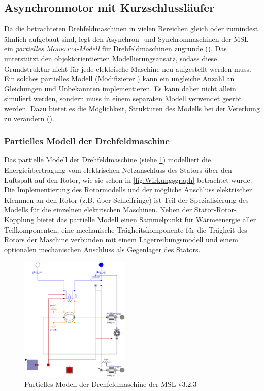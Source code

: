 \subsection{Asynchronmotor mit Kurzschlussläufer}\label{sec:asynchronmotor-mit-kurzschlussluxe4ufer}
Da die betrachteten Drehfeldmaschinen in vielen Bereichen gleich oder zumindest ähnlich aufgebaut sind, legt \cite{kralModelicaObjektorientierteModellbildung2019} den Asynchron- und Synchronmaschinen der MSL ein \emph{partielles \textsc{Modelica}-Modell} für Drehfeldmaschinen zugrunde (). Das unterstützt den objektorientierten Modellierungsansatz, sodass diese Grundstruktur nicht für jede elektrische Maschine neu aufgestellt werden muss. Ein solches partielles Modell (Modifizierer ) kann ein ungleiche Anzahl an Gleichungen und Unbekannten implementieren. Es kann daher nicht allein simuliert werden, sondern muss in einem separaten Modell verwendet geerbt werden. Dazu bietet es die Möglichkeit, Strukturen des Modells bei der Vererbung zu verändern ().

\subsubsection{Partielles Modell der Drehfeldmaschine}\label{sec:partielles-modell-der-drehfeldmaschine}
Das partielle Modell der Drehfeldmaschine (siehe \cref{fig:partiellDrehfeldmaschinen}) modelliert die Energieübertragung vom elektrischen Netzanschluss des Stators über den Luftspalt auf den Rotor, wie sie schon in \cref{fig:Wirkungsgraph} betrachtet wurde. Die Implementierung des Rotormodells und der mögliche Anschluss elektrischer Klemmen an den Rotor (z.B. über Schleifringe) ist Teil der Spezialisierung des Modells für die einzelnen elektrischen Maschinen. Neben der Stator-Rotor-Kopplung bietet das partielle Modell einen Sammelpunkt für Wärmeenergie aller Teilkomponenten, eine mechanische Trägheitskomponente für die Trägheit des Rotors der Maschine verbunden mit einem Lagerreibungsmodell und einem optionalen mechanischen Anschluss als Gegenlager des Stators.

\begin{figure}
\centering
\includegraphics[height=6cm]{Bilder/PartialBasicInductionMachine.pdf}
\caption{Partielles Modell der Drehfeldmaschine  der MSL v3.2.3}
\label{fig:partiellDrehfeldmaschinen}
\end{figure}

